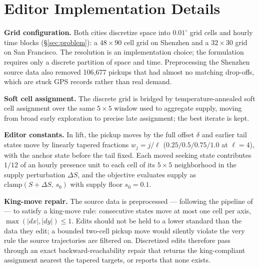 \section{Editor Implementation Details}\label{app:editor}

\textbf{Grid configuration.} Both cities discretize space into
$0.01^{\circ}$ grid cells and hourly time blocks (\S\ref{sec:problem}):
a $48{\times}90$ cell grid on Shenzhen and a $32{\times}30$ grid on San
Francisco. The resolution is an implementation choice; the formulation
requires only a discrete partition of space and time. Preprocessing the
Shenzhen source data also removed 106{,}677 pickups that had almost no
matching drop-offs, which are stuck GPS records rather than real demand.

\textbf{Soft cell assignment.} The discrete grid is bridged by
tem\-per\-a\-ture-annealed soft cell assignment
\cite{jang2017gumbel,maddison2017concrete,bengio2013ste} over the same
$5{\times}5$ window used to aggregate supply, moving from broad early
exploration to precise late assignment; the best iterate is kept.

\textbf{Editor constants.} In lift, the pickup moves by the full offset
$\delta$ and earlier tail states move by linearly tapered fractions
$w_j = j/\ell$ ($0.25/0.5/0.75/1.0$ at $\ell = 4$), with the anchor state
before the tail fixed. Each moved seeking state contributes $1/12$ of an hourly
presence unit to each cell of its $5{\times}5$ neighborhood in the supply
perturbation $\Delta S$, and the objective evaluates supply as
$\mathrm{clamp}(S + \Delta S,\, s_0)$ with supply floor $s_0 = 0.1$.

\textbf{King-move repair.} The source data is preprocessed --- following the
pipeline of \cite{zhang2022cgail} --- to satisfy a king-move rule: consecutive
states move at most one cell per axis, $\max(|dx|,|dy|) \le 1$. Edits should
not be held to a lower standard than the data they edit; a bounded two-cell
pickup move would silently violate the very rule the source trajectories are
filtered on. Discretized edits therefore pass through an exact
backward-reachability repair that returns the king-compliant assignment
nearest the tapered targets, or reports that none exists.

